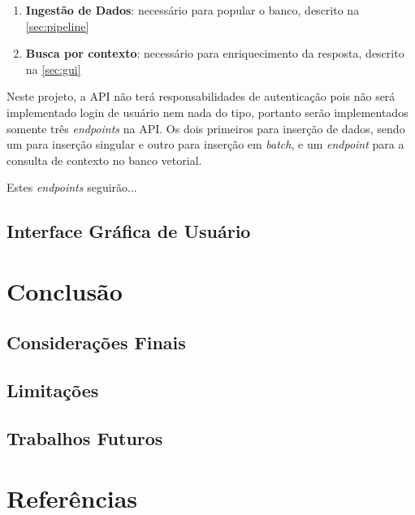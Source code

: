 \documentclass[a4paper, 12pt]{article}
\begin{document}
    \begin{enumerate}
        \item \textbf{Ingestão de Dados}: necessário para popular o banco, descrito na \autoref{sec:pipeline}
        \item \textbf{Busca por contexto}: necessário para enriquecimento da resposta, descrito na \autoref{sec:gui}
    \end{enumerate}

    Neste projeto, a API não terá responsabilidades de autenticação pois não será implementado login de usuário nem nada do tipo, portanto serão implementados somente três \textit{endpoints} na API. Os dois primeiros para inserção de dados, sendo um para inserção singular e outro para inserção em \textit{batch}, e um \textit{endpoint} para a consulta de contexto no banco vetorial.

    Estes \textit{endpoints} seguirão...
    
    \subsection{Interface Gráfica de Usuário}
    \lipsum[3-4]

    \clearpage

    \section{Conclusão}
    \subsection{Considerações Finais}
    \lipsum[1-2]
    \subsection{Limitações}
    \lipsum[3-4]
    \subsection{Trabalhos Futuros}
    \lipsum[5-6]

    \clearpage

    \section*{Referências}

    \nocite{*}

    \sectionfont{\raggedright}
    \printbibliography
    
\end{document}
